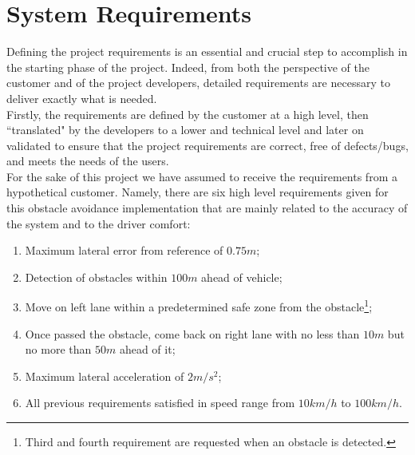 \section{System Requirements} \label{System_Requirements}


Defining the project requirements is an essential and crucial step to accomplish in the starting phase of the project. Indeed, from both the perspective of the customer and of the project developers, detailed requirements are necessary to deliver exactly what is needed.\\
Firstly, the requirements are defined by the customer at a high level, then ``translated" by the developers to a lower and technical level and later on validated to ensure that the project requirements are correct, free of defects/bugs, and meets the needs of the users.\\
For the sake of this project we have assumed to receive the requirements from a hypothetical customer.
Namely, there are six high level requirements given for this obstacle avoidance implementation that are mainly related to the accuracy of the system and to the driver comfort:
\begin{enumerate}
    \item Maximum lateral error from reference of $0.75 m$;
    \item Detection of obstacles within $100 m$ ahead of vehicle;
    \item Move on left lane within a predetermined safe zone from the obstacle\footnote{Third and fourth requirement are requested when an obstacle is detected.};
    \item Once passed the obstacle, come back on right lane with no less than $10 m$ but no more than $50 m$ ahead of it;
    \item Maximum lateral acceleration of $2 m/s^2$;
    \item All previous requirements satisfied in speed range from $10 km/h$ to $100 km/h$.
\end{enumerate}
